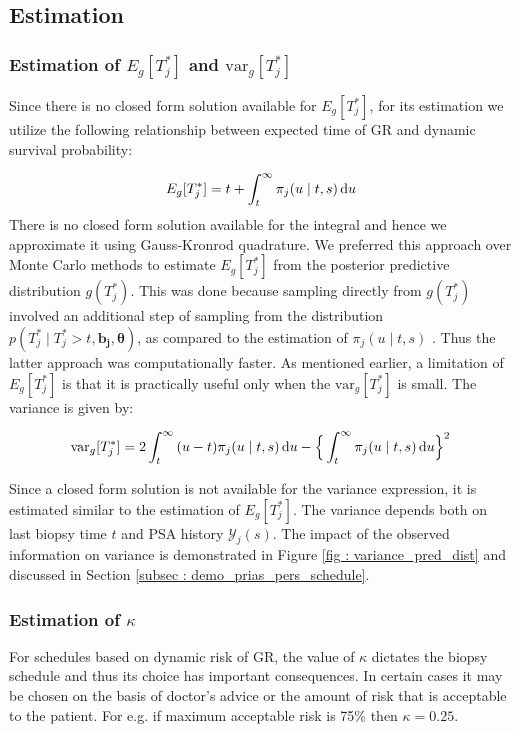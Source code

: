 \subsection{Estimation}
\subsubsection{Estimation of $E_g[T^*_j]$ and $\mbox{var}_g[T^*_j]$}
Since there is no closed form solution available for $E_g[T^*_j]$, for its estimation we utilize the following relationship between expected time of GR and dynamic survival probability:

\begin{equation}
\label{eq : expected_time_survprob}
E_g[T^*_j] = t + \int_t^\infty \pi_j(u \mid t, s) \mathop{}\!\mathrm{d} u
\end{equation}
There is no closed form solution available for the integral and hence we approximate it using Gauss-Kronrod quadrature. We preferred this approach over Monte Carlo methods to estimate $E_g[T^*_j]$ from the posterior predictive distribution $g(T^*_j)$. This was done because sampling directly from $g(T^*_j)$ involved an additional step of sampling from the distribution $p(T^*_j \mid T^*_j > t, \boldsymbol{b_j}, \boldsymbol{\theta})$, as compared to the estimation of $\pi_j(u \mid t, s)$ \citep{rizopoulos2011dynamic}. Thus the latter approach was computationally faster. As mentioned earlier, a limitation of $E_g[T^*_j]$ is that it is practically useful only when the $\mbox{var}_g[T^*_j]$ is small. The variance is given by:

\begin{equation}
\label{eq : var_time_survprob}
\mbox{var}_g[T^*_j] = 2 \int_t^\infty {(u-t) \pi_j(u \mid t, s) \mathop{}\!\mathrm{d}u} - \Big\{\int_t^\infty \pi_j(u \mid t, s) \mathop{}\!\mathrm{d} u\Big\}^2
\end{equation}

Since a closed form solution is not available for the variance expression, it is estimated similar to the estimation of $E_g[T^*_j]$. The variance depends both on last biopsy time $t$ and PSA history $\mathcal{Y}_j(s)$. The impact of the observed information on variance is demonstrated in Figure \ref{fig : variance_pred_dist} and discussed in Section \ref{subsec : demo_prias_pers_schedule}.

\subsubsection{Estimation of $\kappa$}
\label{subsubsec : kappa_estimation}
For schedules based on dynamic risk of GR, the value of $\kappa$ dictates the biopsy schedule and thus its choice has important consequences. In certain cases it may be chosen on the basis of doctor's advice or the amount of risk that is acceptable to the patient. For e.g. if maximum acceptable risk is 75\% then $\kappa = 0.25$.\\

